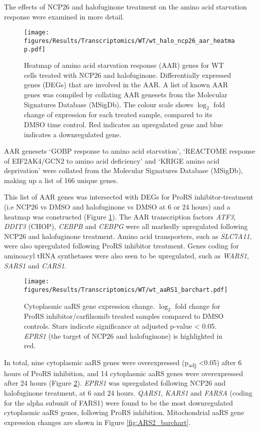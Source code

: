 The effects of NCP26 and halofuginone treatment on the amino acid starvation response were examined in more detail.
\begin{figure}[p]
\centering
\texttt{[image: figures/Results/Transcriptomics/WT/wt\_halo\_ncp26\_aar\_heatmap.pdf]}
\caption[Amino acid starvation response genes heatmap- WT cells]{Heatmap of amino acid starvation response (AAR) genes for WT cells treated with NCP26 and halofuginone.
Differentially expressed genes (DEGs) that are involved in the AAR.
A list of known AAR genes was compiled by collating AAR genesets from the Molecular Signatures Database (MSigDb).
The colour scale shows $\log_{2}$ fold change of expression for each treated sample, compared to its DMSO time control.
Red indicates an upregulated gene and blue indicates a downregulated gene.
}
\label{fig:wt_aar_heatmap}
\end{figure}
%
AAR genesets `GOBP response to amino acid starvation', `REACTOME response of EIF2AK4/GCN2 to amino acid deficiency' and `KRIGE amino acid deprivation' were collated from the Molecular Signatures Database (MSigDb), making up a list of 166 unique genes.

This list of AAR genes was intersected with DEGs for ProRS inhibitor-treatment (i.e NCP26 vs DMSO and halofuginone vs DMSO at 6 or 24 hours) and a heatmap was constructed (Figure \ref{fig:wt_aar_heatmap}).
The AAR transcription factors \textit{ATF3}, \textit{DDIT3} (CHOP), \textit{CEBPB} and \textit{CEBPG} were all markedly upregulated following NCP26 and halofuginone treatment.
Amino acid transporters, such as \textit{SLC7A11}, were also upregulated following ProRS inhibitor treatment.
Genes coding for aminoacyl tRNA synthetases were also seen to be upregulated, such as \textit{WARS1}, \textit{SARS1} and \textit{CARS1}.
\begin{figure}[htb]
\centering
\texttt{[image: figures/Results/Transcriptomics/WT/wt\_aaRS1\_barchart.pdf]}
\caption[Cytoplasmic aaRS gene expression change- WT cells]{Cytoplasmic aaRS gene expression change.
$\log_{2}$ fold change for ProRS inhibitor/carfilzomib treated samples compared to DMSO controls.
Stars indicate significance at adjusted p-value < 0.05.
\textit{EPRS1} (the target of NCP26 and halofuginone) is highlighted in red.
}
\label{fig:wt_ARS1}
\end{figure}
In total, nine cytoplasmic aaRS genes were overexpressed (p\textsubscript{adj} <0.05) after 6 hours of ProRS inhibition, and 14 cytoplasmic aaRS genes were overexpressed after 24 hours (Figure \ref{fig:wt_ARS1}).
\textit{EPRS1} was upregulated following NCP26 and halofuginone treatment, at 6 and 24 hours.
\textit{QARS1}, \textit{KARS1} and \textit{FARSA} (coding for the alpha subunit of FARS1) were found to be the most downregulated cytoplasmic aaRS genes, following ProRS inhibition.
Mitochondrial aaRS gene expression changes are shown in Figure \ref{fig:ARS2_barchart}.

